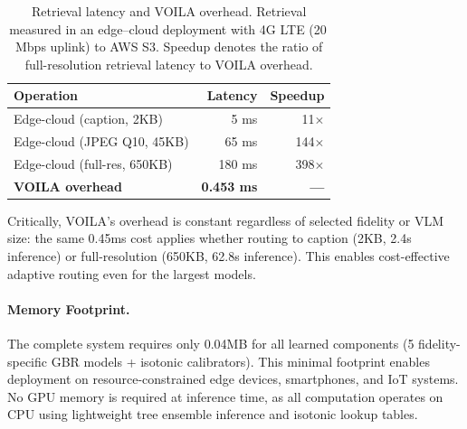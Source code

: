 \begin{table}[h]
\centering
\small
\begin{tabular}{lrr}
\toprule
\textbf{Operation} & \textbf{Latency} & \textbf{Speedup} \\
\midrule
Edge-cloud (caption, 2KB) & 5 ms & 11$\times$ \\
Edge-cloud (JPEG Q10, 45KB) & 65 ms & 144$\times$ \\
Edge-cloud (full-res, 650KB) & 180 ms & 398$\times$ \\
\midrule
\textbf{VOILA overhead} & \textbf{0.453 ms} & \textbf{---} \\
\bottomrule
\end{tabular}
\caption{Retrieval latency and \textsc{VOILA} overhead.
Retrieval measured in an edge--cloud deployment with 4G LTE (20\,Mbps uplink) to AWS S3.
Speedup denotes the ratio of full-resolution retrieval latency to \textsc{VOILA} overhead.}
\label{tab:retrieval_latency}
\end{table}



Critically, VOILA's overhead is constant regardless of selected fidelity or VLM size: the same 0.45ms cost applies whether routing to caption (2KB, 2.4s inference) or full-resolution (650KB, 62.8s inference). This enables cost-effective adaptive routing even for the largest models.

\paragraph{Memory Footprint.}
The complete system requires only 0.04MB for all learned components (5 fidelity-specific GBR models + isotonic calibrators). This minimal footprint enables deployment on resource-constrained edge devices, smartphones, and IoT systems. No GPU memory is required at inference time, as all computation operates on CPU using lightweight tree ensemble inference and isotonic lookup tables.

